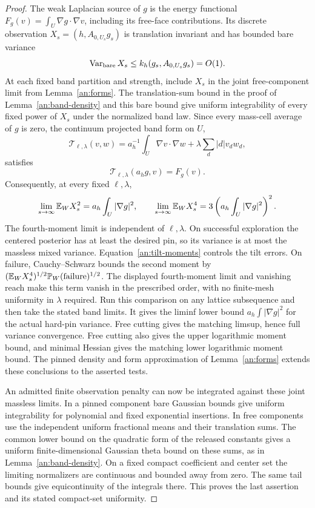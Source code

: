 \begin{proof}
The weak Laplacian source of $g$ is the energy functional
$F_g(v)=\int_U\nabla g\cdot\nabla v$, including its free-face
contributions.  Its discrete observation
$X_s=(h,A_{0,U_s}g_s)$ is translation invariant and has bounded
bare variance
\[
 \operatorname{Var}_{\rm bare}X_s
 \le k_h(g_s,A_{0,U_s}g_s)=O(1).
\]
At each fixed band partition and strength, include $X_s$ in the
joint free-component limit from Lemma~\ref{an:forms}.  The
translation-sum bound in the proof of Lemma~\ref{an:band-density}
and this bare bound give uniform integrability of every fixed
power of $X_s$ under the normalized band law.  Since every mass-cell
average of $g$ is zero, the continuum projected band form on $U$,
\[
 \mathcal T_{\ell,\lambda}(v,w)
 =a_h^{-1}\int_U\nabla v\cdot\nabla w
       +\lambda\sum_d|d|v_dw_d ,
\]
satisfies
\[
 \mathcal T_{\ell,\lambda}(a_hg,v)=F_g(v).
\]
Consequently, at every fixed $\ell,\lambda$,
\[
 \lim_{s\to\infty}\mathbb E_W X_s^2=a_h\int_U|\nabla g|^2,\qquad
 \lim_{s\to\infty}\mathbb E_W X_s^4
       =3\left(a_h\int_U|\nabla g|^2\right)^2 .
\]
The fourth-moment limit is independent of $\ell,\lambda$.
On successful exploration the centered posterior has at least
the desired pin, so its variance is at most the massless mixed
variance.  Equation~\eqref{an:tilt-moments} controls the tilt
errors.  On failure, Cauchy--Schwarz bounds the second moment by
$(\mathbb E_WX_s^4)^{1/2}\mathbb P_W(\mathrm{failure})^{1/2}$.
The displayed fourth-moment limit and vanishing reach make this
term vanish in the prescribed order, with no finite-mesh
uniformity in $\lambda$ required.
Run this comparison on any lattice subsequence and then take the stated
band limits. It gives the liminf lower bound
$a_h\int|\nabla g|^2$ for the actual hard-pin variance.
Free cutting gives the matching limsup, hence full variance convergence.
Free cutting also gives the upper logarithmic moment bound, and
minimal Hessian gives the matching lower
logarithmic moment bound.  The pinned density
and form approximation of
Lemma~\ref{an:forms} extends these conclusions
to the asserted tests.

An admitted finite observation penalty can now be integrated
against these joint massless limits.  In a pinned component bare
Gaussian bounds give uniform integrability for polynomial and
fixed exponential insertions.  In free components use the
independent uniform fractional means and their translation sums.
The common lower bound on the quadratic form of the released
constants gives a uniform finite-dimensional Gaussian theta bound
on these sums, as in Lemma~\ref{an:band-density}.  On a fixed compact
coefficient and center set the limiting normalizers are continuous
and bounded away from zero.  The same tail bounds give
equicontinuity of the integrals there.  This proves the last
assertion and its stated compact-set uniformity.
\end{proof}


